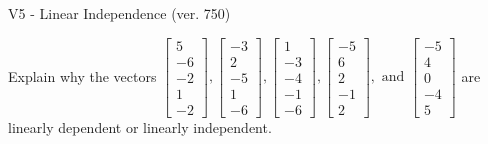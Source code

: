 \begin{exercise}
  \begin{exerciseTitle}V5 - Linear Independence (ver. 750)\end{exerciseTitle}
  \begin{exerciseStatement}
    Explain why the vectors \(\left[\begin{array}{r}
5 \\
-6 \\
-2 \\
1 \\
-2
\end{array}\right] , \left[\begin{array}{r}
-3 \\
2 \\
-5 \\
1 \\
-6
\end{array}\right] , \left[\begin{array}{r}
1 \\
-3 \\
-4 \\
-1 \\
-6
\end{array}\right] , \left[\begin{array}{r}
-5 \\
6 \\
2 \\
-1 \\
2
\end{array}\right] , \text{ and } \left[\begin{array}{r}
-5 \\
4 \\
0 \\
-4 \\
5
\end{array}\right]\) are linearly dependent or linearly independent.	



\end{exerciseStatement}
\end{exercise}

